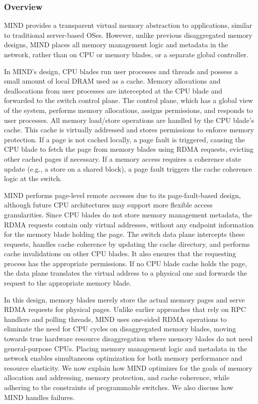 \subsubsection{Overview}
MIND provides a transparent virtual memory abstraction to applications, similar to traditional server-based OSes. However, unlike previous disaggregated memory designs, MIND places all memory management logic and metadata in the network, rather than on CPU or memory blades, or a separate global controller.

In MIND's design, CPU blades run user processes and threads and possess a small amount of local DRAM used as a cache. Memory allocations and deallocations from user processes are intercepted at the CPU blade and forwarded to the switch control plane. The control plane, which has a global view of the system, performs memory allocations, assigns permissions, and responds to user processes. All memory load/store operations are handled by the CPU blade's cache. This cache is virtually addressed and stores permissions to enforce memory protection. If a page is not cached locally, a page fault is triggered, causing the CPU blade to fetch the page from memory blades using RDMA requests, evicting other cached pages if necessary. If a memory access requires a coherence state update (e.g., a store on a shared block), a page fault triggers the cache coherence logic at the switch.

MIND performs page-level remote accesses due to its page-fault-based design, although future CPU architectures may support more flexible access granularities. Since CPU blades do not store memory management metadata, the RDMA requests contain only virtual addresses, without any endpoint information for the memory blade holding the page. The switch data plane intercepts these requests, handles cache coherence by updating the cache directory, and performs cache invalidations on other CPU blades. It also ensures that the requesting process has the appropriate permissions. If no CPU blade cache holds the page, the data plane translates the virtual address to a physical one and forwards the request to the appropriate memory blade.

In this design, memory blades merely store the actual memory pages and serve RDMA requests for physical pages. Unlike earlier approaches that rely on RPC handlers and polling threads, MIND uses one-sided RDMA operations to eliminate the need for CPU cycles on disaggregated memory blades, moving towards true hardware resource disaggregation where memory blades do not need general-purpose CPUs.
Placing memory management logic and metadata in the network enables simultaneous optimization for both memory performance and resource elasticity. We now explain how MIND optimizes for the goals of memory allocation and addressing, memory protection, and cache coherence, while adhering to the constraints of programmable switches. We also discuss how MIND handles failures.

